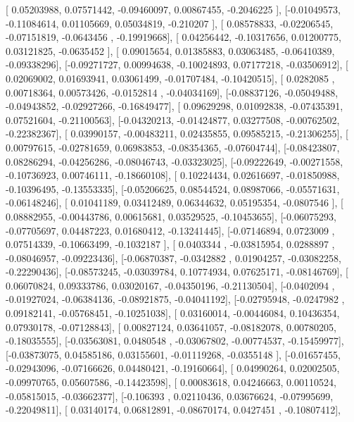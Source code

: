 \documentclass{article}
\begin{document}
       [ 0.05203988,  0.07571442, -0.09460097,  0.00867455, -0.2046225 ],
       [-0.01049573, -0.11084614,  0.01105669,  0.05034819, -0.210207  ],
       [ 0.08578833, -0.02206545, -0.07151819, -0.0643456 , -0.19919668],
       [ 0.04256442, -0.10317656,  0.01200775,  0.03121825, -0.0635452 ],
       [ 0.09015654,  0.01385883,  0.03063485, -0.06410389, -0.09338296],
       [-0.09271727,  0.00994638, -0.10024893,  0.07177218, -0.03506912],
       [ 0.02069002,  0.01693941,  0.03061499, -0.01707484, -0.10420515],
       [ 0.0282085 ,  0.00718364,  0.00573426, -0.0152814 , -0.04034169],
       [-0.08837126, -0.05049488, -0.04943852, -0.02927266, -0.16849477],
       [ 0.09629298,  0.01092838, -0.07435391,  0.07521604, -0.21100563],
       [-0.04320213, -0.01424877,  0.03277508, -0.00762502, -0.22382367],
       [ 0.03990157, -0.00483211,  0.02435855,  0.09585215, -0.21306255],
       [ 0.00797615, -0.02781659,  0.06983853, -0.08354365, -0.07604744],
       [-0.08423807,  0.08286294, -0.04256286, -0.08046743, -0.03323025],
       [-0.09222649, -0.00271558, -0.10736923,  0.00746111, -0.18660108],
       [ 0.10224434,  0.02616697, -0.01850988, -0.10396495, -0.13553335],
       [-0.05206625,  0.08544524,  0.08987066, -0.05571631, -0.06148246],
       [ 0.01041189,  0.03412489,  0.06344632,  0.05195354, -0.0807546 ],
       [ 0.08882955, -0.00443786,  0.00615681,  0.03529525, -0.10453655],
       [-0.06075293, -0.07705697,  0.04487223,  0.01680412, -0.13241445],
       [-0.07146894,  0.0723009 ,  0.07514339, -0.10663499, -0.1032187 ],
       [ 0.0403344 , -0.03815954,  0.0288897 , -0.08046957, -0.09223436],
       [-0.06870387, -0.0342882 ,  0.01904257, -0.03082258, -0.22290436],
       [-0.08573245, -0.03039784,  0.10774934,  0.07625171, -0.08146769],
       [ 0.06070824,  0.09333786,  0.03020167, -0.04350196, -0.21130504],
       [-0.0402094 , -0.01927024, -0.06384136, -0.08921875, -0.04041192],
       [-0.02795948, -0.0247982 ,  0.09182141, -0.05768451, -0.10251038],
       [ 0.03160014, -0.00446084,  0.10436354,  0.07930178, -0.07128843],
       [ 0.00827124,  0.03641057, -0.08182078,  0.00780205, -0.18035555],
       [-0.03563081,  0.0480548 , -0.03067802, -0.00774537, -0.15459977],
       [-0.03873075,  0.04585186,  0.03155601, -0.01119268, -0.0355148 ],
       [-0.01657455, -0.02943096, -0.07166626,  0.04480421, -0.19160664],
       [ 0.04990264,  0.02002505, -0.09970765,  0.05607586, -0.14423598],
       [ 0.00083618,  0.04246663,  0.00110524, -0.05815015, -0.03662377],
       [-0.106393  ,  0.02110436,  0.03676624, -0.07995699, -0.22049811],
       [ 0.03140174,  0.06812891, -0.08670174,  0.0427451 , -0.10807412],
\end{document}
